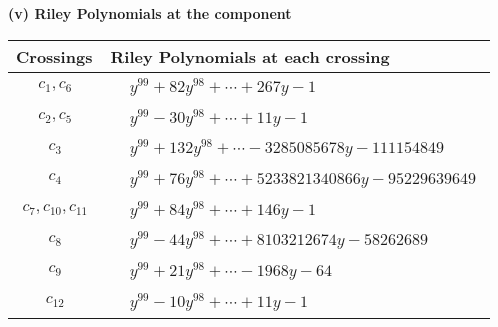 \documentclass[1p]{elsarticle_modified}
\theoremstyle{definition}
\begin{document}
\newpage\renewcommand{\arraystretch}{1}
\flushleft \textbf{(v) Riley Polynomials at the component}\newline \\
\begin{tabular}{m{50pt}|m{274pt}}
Crossings & \hspace{64pt}Riley Polynomials at each crossing \\
\hline $$\begin{aligned}c_{1},c_{6}\end{aligned}$$&$\begin{aligned}
&y^{99}+82 y^{98}+\cdots+267 y-1
\end{aligned}$\\
\hline $$\begin{aligned}c_{2},c_{5}\end{aligned}$$&$\begin{aligned}
&y^{99}-30 y^{98}+\cdots+11 y-1
\end{aligned}$\\
\hline $$\begin{aligned}c_{3}\end{aligned}$$&$\begin{aligned}
&y^{99}+132 y^{98}+\cdots-3285085678 y-111154849
\end{aligned}$\\
\hline $$\begin{aligned}c_{4}\end{aligned}$$&$\begin{aligned}
&y^{99}+76 y^{98}+\cdots+5233821340866 y-95229639649
\end{aligned}$\\
\hline $$\begin{aligned}c_{7},c_{10},c_{11}\end{aligned}$$&$\begin{aligned}
&y^{99}+84 y^{98}+\cdots+146 y-1
\end{aligned}$\\
\hline $$\begin{aligned}c_{8}\end{aligned}$$&$\begin{aligned}
&y^{99}-44 y^{98}+\cdots+8103212674 y-58262689
\end{aligned}$\\
\hline $$\begin{aligned}c_{9}\end{aligned}$$&$\begin{aligned}
&y^{99}+21 y^{98}+\cdots-1968 y-64
\end{aligned}$\\
\hline $$\begin{aligned}c_{12}\end{aligned}$$&$\begin{aligned}
&y^{99}-10 y^{98}+\cdots+11 y-1
\end{aligned}$\\
\hline
\end{tabular}\\~\\
\end{document}
